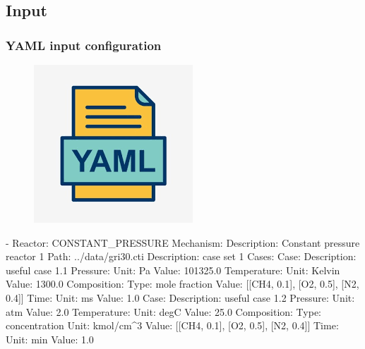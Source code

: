 \documentclass{beamer}
\begin{document}
\subsection{Input}
\begin{frame}[fragile]\frametitle{YAML input configuration}
\vspace{-0.35cm}
\begin{minipage}{.3\textwidth}
 \begin{figure}
  \centering
  \includegraphics[width=0.5\linewidth]{figures/yaml.png}
\end{figure}
\end{minipage}
\begin{minipage}{.6\textwidth}
\begin{verbnobox}[\fontsize{6pt}{6pt}\selectfont]
- Reactor:        CONSTANT_PRESSURE
  Mechanism:
    Description:  Constant pressure reactor 1
    Path:         ../data/gri30.cti
  Description:    case set 1
  Cases:
    Case:
      Description: useful case 1.1
      Pressure:
        Unit:  Pa
        Value: 101325.0
      Temperature:
        Unit:  Kelvin
        Value: 1300.0
      Composition:
        Type:  mole fraction
        Value: [[CH4, 0.1], [O2, 0.5], [N2, 0.4]]
      Time:
        Unit:  ms
        Value: 1.0
    Case:
      Description: useful case 1.2
      Pressure:
        Unit:  atm
        Value: 2.0
      Temperature:
        Unit:  degC
        Value: 25.0
      Composition:
        Type:  concentration
        Unit:  kmol/cm^3
        Value: [[CH4, 0.1], [O2, 0.5], [N2, 0.4]]
      Time:
        Unit:  min
        Value: 1.0
\end{verbnobox}
\end{minipage}
\end{frame}
\end{document}
